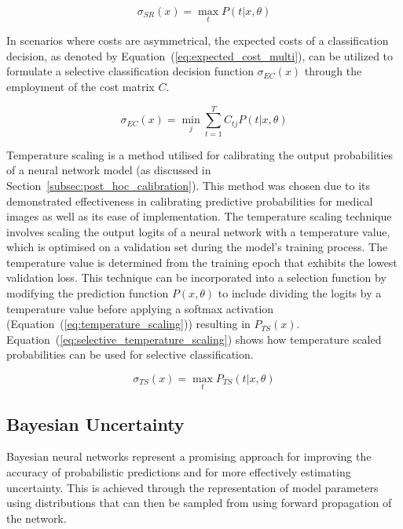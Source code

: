 \begin{equation}
	\sigma_{SR}(x) = \max_tP(t|x,\theta)
	\label{eq:softmax_response}
\end{equation}

\noindent In scenarios where costs are asymmetrical, the expected costs of a classification decision, as denoted by Equation~(\ref{eq:expected_cost_multi}), can be utilized to formulate a selective classification decision function $\sigma_{EC}(x)$ through the employment of the cost matrix $C$. 

\begin{equation}
	\sigma_{EC}(x) = \min_j\sum^T_{t=1}C_{tj}P(t|x,\theta)
	\label{eq:expected_cost_scoring}
\end{equation}

Temperature scaling is a method utilised for calibrating the output probabilities of a neural network model (as discussed in Section~\ref{subsec:post_hoc_calibration}). This method was chosen due to its demonstrated effectiveness in calibrating predictive probabilities for medical images as well as its ease of implementation. The temperature scaling technique involves scaling the output logits of a neural network with a temperature value, which is optimised on a validation set during the model's training process. The temperature value is determined from the training epoch that exhibits the lowest validation loss. This technique can be incorporated into a selection function by modifying the prediction function $P(x, \theta)$ to include dividing the logits by a temperature value before applying a softmax activation (Equation~(\ref{eq:temperature_scaling})) resulting in $P_{TS}(x)$. Equation~(\ref{eq:selective_temperature_scaling}) shows how temperature scaled probabilities can be used for selective classification.

\begin{equation}
	\sigma_{TS}(x) = \max_tP_{TS}(t|x,\theta)
	\label{eq:selective_temperature_scaling}
\end{equation}

\subsection{Bayesian Uncertainty}
\label{subsec:selective_uncertainity}
Bayesian neural networks represent a promising approach for improving the accuracy of probabilistic predictions and for more effectively estimating uncertainty. This is achieved through the representation of model parameters using distributions that can then be sampled from using forward propagation of the network.

